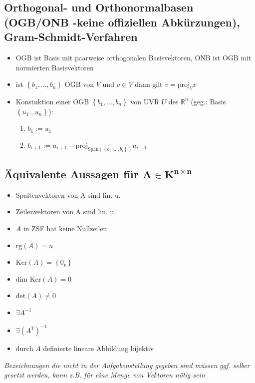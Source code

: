 \documentclass[10pt,a4paper]{article}
\begin{document}
\subsection{Orthogonal- und Orthonormalbasen (OGB/ONB -keine offiziellen Abkürzungen), Gram-Schmidt-Verfahren }
\begin{itemize}
\item OGB ist Basis mit paarweise orthogonalen Basisvektoren, ONB ist OGB mit normierten Basisvektoren
\item ist $\left\lbrace b_{1},\dotsc, b_{n}\right\rbrace$ OGB von $V$ und $v\in V$ dann gilt $v=\text{proj}_{V}v$
\item Konstuktion einer OGB $\left\lbrace b_{1},\dotsc, b_{n}\right\rbrace$ von UVR $U$ des $\mathbb{R}^{n}$ (geg.: Basis $\left\lbrace u_{1} \dotsc u_{n}\right\rbrace$):
\begin{enumerate}
\item $b_{1}:=u_{1}$
\item $b_{i+1}:=u_{i+1}-\text{proj}_{\text{Span}(\left\lbrace b_{1},\dotsc,b_{i}\right\rbrace)}u_{i+1}$
\end{enumerate}
\end{itemize}



\subsection{Äquivalente Aussagen für $\boldsymbol{A\in K^{n\times n}}$}
\begin{itemize}
\item Spaltenvektoren von A sind lin. u. 
\item Zeilenvektoren von A sind lin. u.
\item $A$ in ZSF hat keine Nullzeilen 
\item $\text{rg}(A)= n $
\item $\text{Ker}(A)=\left\lbrace 0_{v}\right\rbrace$
\item $\text{dim Ker}(A)=0$
\item $\text{det}(A)\neq 0$
\item $\exists A^{-1}$ 
\item $\exists (A^{T})^{-1}$
\item durch $A$ definierte lineare Abbildung bijektiv
\end{itemize}
\noindent \textit{Bezeichnungen die nicht in der Aufgabenstellung gegeben sind müssen ggf. selber gesetzt werden, kann z.B. für eine Menge von Vektoren nötig sein}
\end{document}

